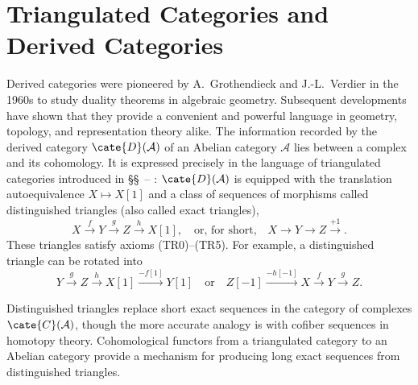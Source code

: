 
\chapter{Triangulated Categories and Derived Categories\texorpdfstring{\hspace{0.1em}}{}}%
\label{sec:triangulated-derived-cat}
\hypertarget{o014.aljabr2.chapter4.overview}{ }

Derived categories were pioneered by A.\ Grothendieck and J.-L.\ Verdier in
the 1960s to study duality theorems in algebraic geometry. Subsequent
developments have shown that they provide a convenient and powerful language
in geometry, topology, and representation theory alike. The information
recorded by the derived category $\cate{D}(\mathcal{A})$ of an Abelian
category $\mathcal{A}$ lies between a complex and its cohomology. It is
expressed precisely in the language of triangulated categories introduced in
\S\S~--%
: $\cate{D}(\mathcal{A})$ is
equipped with the translation autoequivalence $X\mapsto X[1]$ and a class of
sequences of morphisms called distinguished triangles (also called exact
triangles),
\[
  X \xrightarrow{f} Y \xrightarrow{g} Z \xrightarrow{h} X[1],
  \quad \text{or, for short,}\quad X\to Y\to Z\xrightarrow{+1} .
\]
These triangles satisfy axioms (TR0)--(TR5). For example, a distinguished
triangle can be rotated into
\[
  Y \xrightarrow{g} Z \xrightarrow{h} X[1] \xrightarrow{-f[1]} Y[1]
  \quad\text{or}\quad
  Z[-1] \xrightarrow{-h[-1]} X \xrightarrow{f} Y \xrightarrow{g} Z .
\]

Distinguished triangles replace short exact sequences in the category of
complexes $\cate{C}(\mathcal{A})$, though the more accurate analogy is with
cofiber sequences in homotopy theory. Cohomological functors from a
triangulated category to an Abelian category provide a mechanism for
producing long exact sequences from distinguished triangles.

